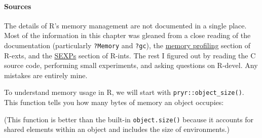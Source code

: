 \begin{Shaded}
\begin{Highlighting}[]
\NormalTok{(}\NormalTok{)}
\NormalTok{(}\NormalTok{)}
\NormalTok{(}\NormalTok{)}
\end{Highlighting}
\end{Shaded}

\paragraph{Sources}

The details of R's memory management are not documented in a single
place. Most of the information in this chapter was gleaned from a close
reading of the documentation (particularly \texttt{?Memory} and
\texttt{?gc}), the
\href{http://cran.r-project.org/doc/manuals/R-exts.html\#Profiling-R-code-for-memory-use}{memory
profiling} section of R-exts, and the
\href{http://cran.r-project.org/doc/manuals/R-ints.html\#SEXPs}{SEXPs}
section of R-ints. The rest I figured out by reading the C source code,
performing small experiments, and asking questions on R-devel. Any
mistakes are entirely mine.


To understand memory usage in R, we will start with
\texttt{pryr::object\_size()}. This function tells you how many bytes of
memory an object occupies: 

\begin{Shaded}
\begin{Highlighting}[]
\NormalTok{(}\NormalTok{:}\NormalTok{)}
\end{Highlighting}
\end{Shaded}

(This function is better than the built-in \texttt{object.size()}
because it accounts for shared elements within an object and includes
the size of environments.)

